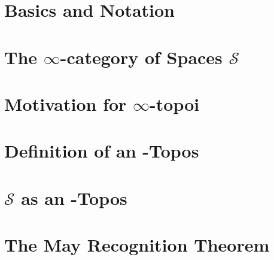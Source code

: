 \documentclass[a4paper,10pt]{scrartcl}
\theoremstyle{plain}
\newcommand{\spaces}{\mathcal{S}}
\newcommand{\inftycat}{}
\def\inftycat/{$\infty$-category}
\begin{document}
    \section{Basics and Notation}
    
    \section{The \inftycat/ of Spaces $\spaces$}
    
    \section{Motivation for $\infty$-topoi}
    \section{Definition of an \infty-Topos}
    
    \section{$\spaces$ as an \infty-Topos}
    
    \section{The May Recognition Theorem}
    
\end{document}
